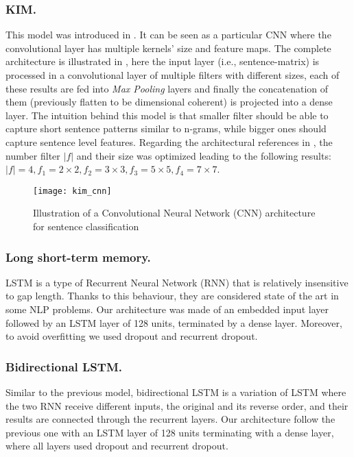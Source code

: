 \subsubsection{KIM.}
This model was introduced in \cite{kim2014convolutional}. It can be seen as a particular CNN where the convolutional layer has multiple kernels' size and feature maps.
The complete architecture is illustrated in , here the input layer (i.e., sentence-matrix) is processed in a convolutional layer of multiple filters with different sizes, each of these results are fed into \emph{Max Pooling} layers and finally the concatenation of them (previously flatten to be dimensional coherent) is projected into a dense layer.
The intuition behind this model is that smaller filter should be able to capture short sentence patterns similar to n-grams, while bigger ones should capture sentence level features.
Regarding the architectural references in \cite{kim2014convolutional}, the number filter $|f|$ and their size was optimized leading to the following results: $|f| = 4, f_1 = 2\times2, f_2 = 3\times3, f_3 = 5\times5, f_4 = 7\times7$.

\begin{figure}[h]
\footnotesize
\centering
\texttt{[image: kim\_cnn]}
\caption{\cite{zhang2015sensitivity} Illustration of a Convolutional Neural Network (CNN) architecture for sentence classification}
\label{fig:kim}
\end{figure}

\subsubsection{Long short-term memory.}
LSTM is a type of Recurrent Neural Network (RNN) that is relatively insensitive to gap length. Thanks to this behaviour, they are considered state of the art in some NLP problems.
Our architecture was made of an embedded input layer followed by an LSTM layer of 128 units, terminated by a dense layer. Moreover, to avoid overfitting we used dropout and recurrent dropout.

\subsubsection{Bidirectional LSTM.} Similar to the previous model, bidirectional LSTM is a variation of LSTM where the two RNN receive different inputs, the original and its reverse order, and their results are connected through the recurrent layers.
Our architecture follow the previous one with an LSTM layer of 128 units terminating with a dense layer, where all layers used dropout and recurrent dropout.

